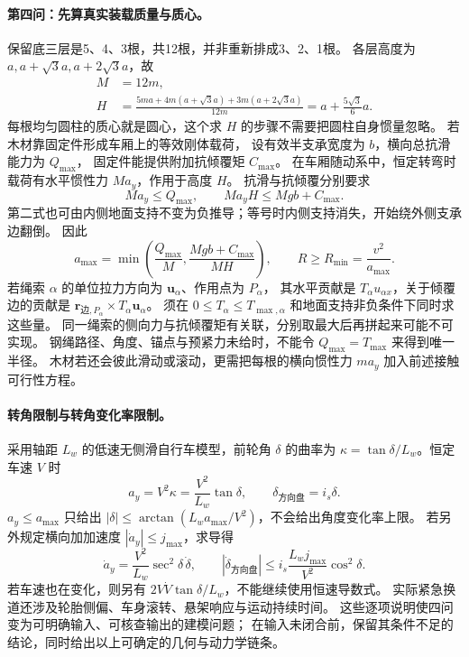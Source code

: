 \documentclass[UTF8,zihao=-4,fontset=fandol,a4paper]{ctexart}
\newcommand{\vect}[1]{\bm{#1}}
\begin{document}
\paragraph{第四问：先算真实装载质量与质心。}
保留底三层是5、4、3根，共12根，并非重新排成3、2、1根。
各层高度为 $a,a+\sqrt3a,a+2\sqrt3a$，故
\begin{align*}
M&=12m,\\
H&=\frac{5ma+4m(a+\sqrt3a)+3m(a+2\sqrt3a)}{12m}
=a+\frac{5\sqrt3}{6}a.
\end{align*}
每根均匀圆柱的质心就是圆心，这个求 $H$ 的步骤不需要把圆柱自身惯量忽略。
若木材靠固定件形成车厢上的等效刚体载荷，
设有效半支承宽度为 $b$，横向总抗滑能力为 $Q_{\max}$，
固定件能提供附加抗倾覆矩 $C_{\max}$。
在车厢随动系中，恒定转弯时载荷有水平惯性力 $Ma_y$，作用于高度 $H$。
抗滑与抗倾覆分别要求
\[
Ma_y\le Q_{\max},\qquad Ma_yH\le Mgb+C_{\max}.
\]
第二式也可由内侧地面支持不变为负推导；等号时内侧支持消失，开始绕外侧支承边翻倒。
因此
\[
a_{\max}=\min\left(\frac{Q_{\max}}M,
\frac{Mgb+C_{\max}}{MH}\right),
\qquad R\ge R_{\min}=\frac{v^2}{a_{\max}}.
\]
若绳索 $\alpha$ 的单位拉力方向为 $\vect u_\alpha$、作用点为 $P_\alpha$，
其水平贡献是 $T_\alpha u_{\alpha x}$，关于倾覆边的贡献是
$\vect r_{\text{边},P_\alpha}\times T_\alpha\vect u_\alpha$。
须在 $0\le T_\alpha\le T_{\max,\alpha}$ 和地面支持非负条件下同时求这些量。
同一绳索的侧向力与抗倾覆矩有关联，分别取最大后再拼起来可能不可实现。
钢绳路径、角度、锚点与预紧力未给时，不能令 $Q_{\max}=T_{\max}$ 来得到唯一半径。
木材若还会彼此滑动或滚动，更需把每根的横向惯性力 $m a_y$ 加入前述接触可行性方程。

\paragraph{转角限制与转角变化率限制。}
采用轴距 $L_w$ 的低速无侧滑自行车模型，前轮角 $\delta$ 的曲率为
$\kappa=\tan\delta/L_w$。恒定车速 $V$ 时
\[
a_y=V^2\kappa=\frac{V^2}{L_w}\tan\delta,
\qquad\delta_{\text{方向盘}}=i_s\delta.
\]
$a_y\le a_{\max}$ 只给出
$|\delta|\le\arctan(L_wa_{\max}/V^2)$，不会给出角度变化率上限。
若另外规定横向加加速度 $|\dot a_y|\le j_{\max}$，求导得
\[
\dot a_y=\frac{V^2}{L_w}\sec^2\delta\,\dot\delta,
\qquad
|\dot\delta_{\text{方向盘}}|
\le i_s\frac{L_wj_{\max}}{V^2}\cos^2\delta.
\]
若车速也在变化，则另有 $2V\dot V\tan\delta/L_w$，不能继续使用恒速导数式。
实际紧急换道还涉及轮胎侧偏、车身滚转、悬架响应与运动持续时间。
这些逐项说明使四问变为可明确输入、可核查输出的建模问题；
在输入未闭合前，保留其条件不足的结论，同时给出以上可确定的几何与动力学链条。
\end{document}
